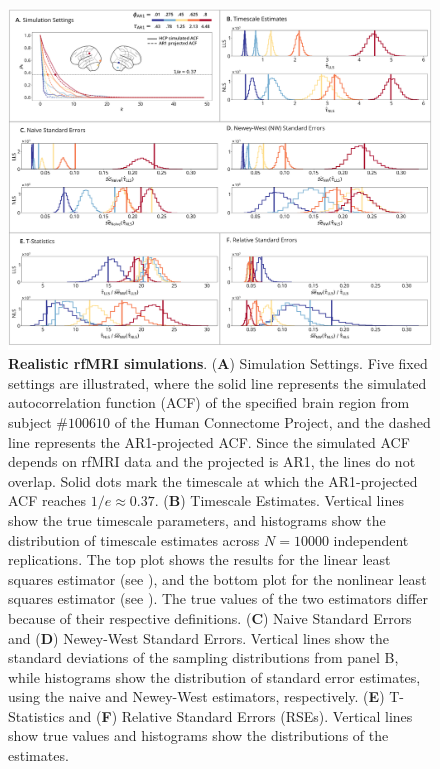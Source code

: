 \documentclass[latex/main.tex]{subfiles}
\begin{document}
\begin{figure}[H]
    \centering
    \includegraphics[width=1\textwidth]{latex/results/fig03-hcp.png} 
    \caption{
    \textbf{Realistic rfMRI simulations}.
    (\textbf{A}) Simulation Settings. Five fixed settings are illustrated, where the solid line represents the simulated autocorrelation function (ACF) of the specified brain region from subject $\#100610$ of the Human Connectome Project, and the dashed line represents the AR1-projected ACF. Since the simulated ACF depends on rfMRI data and the projected is AR1, the lines do not overlap. Solid dots mark the timescale at which the AR1-projected ACF reaches $1/e \approx 0.37$.
    (\textbf{B}) Timescale Estimates. Vertical lines show the true timescale parameters, and histograms show the distribution of timescale estimates across $N=10000$ independent replications. The top plot shows the results for the linear least squares estimator (see ), and the bottom plot for the nonlinear least squares estimator (see ). The true values of the two estimators differ because of their respective definitions.
    (\textbf{C}) Naive Standard Errors and (\textbf{D}) Newey-West Standard Errors. Vertical lines show the standard deviations of the sampling distributions from panel B, while histograms show the distribution of standard error estimates, using the naive and Newey-West estimators, respectively.
    (\textbf{E}) T-Statistics and (\textbf{F}) Relative Standard Errors (RSEs). Vertical lines show true values and histograms show the distributions of the estimates.
    }
    \label{fig:sim-hcp}
\end{figure}
\end{document}
